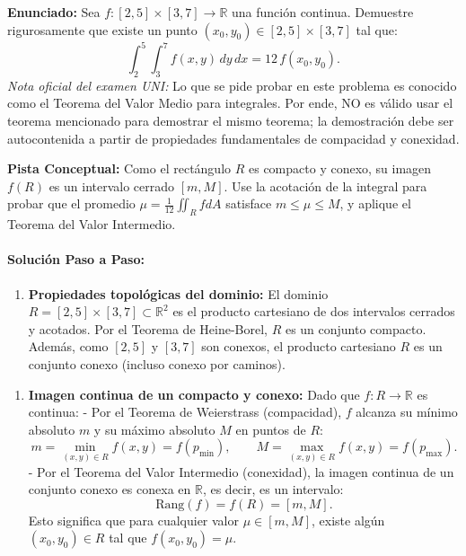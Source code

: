 \documentclass[11pt,a4paper]{article}
\begin{document}
\begin{tcolorbox}[colback=white,colframe=gray!40,arc=1mm,boxrule=0.5pt,left=3mm,right=3mm,top=2mm,bottom=2mm]
\textbf{Enunciado:} Sea $f: [2, 5] \times [3, 7] \to \mathbb{R}$ una función continua. Demuestre rigurosamente que existe un punto $(x_0, y_0) \in [2, 5] \times [3, 7]$ tal que:
\begin{equation*}
\int_2^5 \int_3^7 f(x,y) \, dy \, dx = 12 \, f(x_0, y_0).
\end{equation*}
\textit{Nota oficial del examen UNI:} Lo que se pide probar en este problema es conocido como el Teorema del Valor Medio para integrales. Por ende, NO es válido usar el teorema mencionado para demostrar el mismo teorema; la demostración debe ser autocontenida a partir de propiedades fundamentales de compacidad y conexidad.
\end{tcolorbox}

\begin{tcolorbox}[colback=yellow!4,colframe=accentamber!70,arc=1mm,boxrule=0.5pt,left=3mm,right=3mm,top=1.5mm,bottom=1.5mm]
\textbf{Pista Conceptual:} Como el rectángulo $R$ es compacto y conexo, su imagen $f(R)$ es un intervalo cerrado $[m, M]$. Use la acotación de la integral para probar que el promedio $\mu = \frac{1}{12}\iint_R f dA$ satisface $m \le \mu \le M$, y aplique el Teorema del Valor Intermedio.
\end{tcolorbox}

\paragraph{Solución Paso a Paso:}\par
\begin{enumerate}[label=\textbf{\arabic*.}]
\item \textbf{Propiedades topológicas del dominio:}
El dominio $R = [2, 5] \times [3, 7] \subset \mathbb{R}^2$ es el producto cartesiano de dos intervalos cerrados y acotados.
Por el Teorema de Heine-Borel, $R$ es un conjunto compacto.
Además, como $[2,5]$ y $[3,7]$ son conexos, el producto cartesiano $R$ es un conjunto conexo (incluso conexo por caminos).
\end{enumerate}

\begin{enumerate}[label=\textbf{\arabic*.}]
\item \textbf{Imagen continua de un compacto y conexo:}
Dado que $f: R \to \mathbb{R}$ es continua:
- Por el Teorema de Weierstrass (compacidad), $f$ alcanza su mínimo absoluto $m$ y su máximo absoluto $M$ en puntos de $R$:
\begin{equation*}
m = \min_{(x,y)\in R} f(x,y) = f(p_{\min}), \qquad M = \max_{(x,y)\in R} f(x,y) = f(p_{\max}).
\end{equation*}
- Por el Teorema del Valor Intermedio (conexidad), la imagen continua de un conjunto conexo es conexa en $\mathbb{R}$, es decir, es un intervalo:
\begin{equation*}
\text{Rang}(f) = f(R) = [m, M].
\end{equation*}
Esto significa que para cualquier valor $\mu \in [m, M]$, existe algún $(x_0, y_0) \in R$ tal que $f(x_0, y_0) = \mu$.
\end{enumerate}
\end{document}

